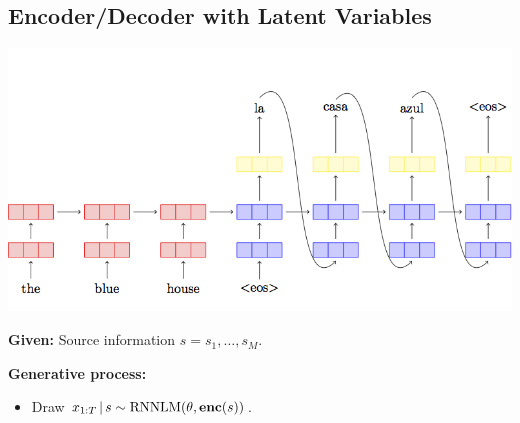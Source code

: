 \subsection{Encoder/Decoder with Latent Variables}

\newcommand{\benc}{\boldsymbol{\mathrm{enc}}}

\begin{frame}
\begin{center}
\includegraphics[scale=0.55]{pics/seq2seq.png}
\end{center}

\textbf{Given:} Source information $s = s_1, \ldots, s_M$.
\air

\textbf{Generative process:}
  \begin{itemize}
      \item Draw $x_{1:T} \given s \sim \RNNLM(\theta, \benc(s))$.
  \end{itemize}




\air
\end{frame}

